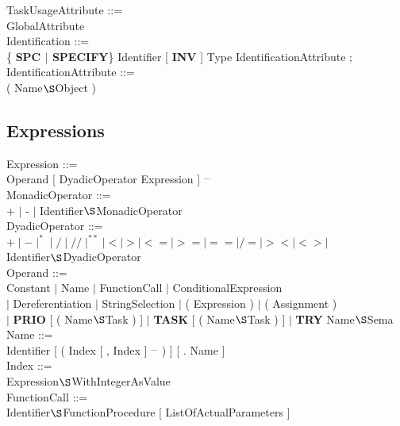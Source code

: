 TaskUsageAttribute ::=\\
 GlobalAttribute\\

Identification ::=\\
\x \{ {\bf SPC $\mid$ SPECIFY}\} Identifier [ {\bf INV} ] Type IdentificationAttribute ;\\

IdentificationAttribute ::= \\
 ( Name$\S $Object )\\

\subsection{Expressions}    %

Expression ::=\\
\x [ MonadicOperator ] Operand [ DyadicOperator   Expression ] $^{...}$\\

MonadicOperator ::=\\
\x + $\mid$ - $\mid$ Identifier$\S $MonadicOperator\\

DyadicOperator ::=\\
\x $ + \mid - \mid ^* \mid / \mid // \mid ^{**} \mid < \mid > \mid <= \mid >= \mid == \mid /= \mid >< \mid <> \mid$\\
\x Identifier$\S $DyadicOperator\\

Operand ::= \\
\x Constant $\mid$ Name $\mid$ FunctionCall $\mid$ ConditionalExpression\\
\x $\mid$ Dereferentiation $\mid$ StringSelection $\mid$ ( Expression ) $\mid$ ( Assignment ) \\
\x $\mid$ {\bf PRIO} [ ( Name$\S $Task ) ] $\mid$ {\bf TASK} [ ( Name$\S $Task ) ] $\mid$ {\bf TRY} Name$\S $Sema\\

Name ::=\\
\x Identifier [ ( Index [ , Index ] $^{...}$ ) ] [ . Name ]\\

Index ::=\\
\x Expression$\S $WithIntegerAsValue\\

FunctionCall ::=\\
\x Identifier$\S $FunctionProcedure [ ListOfActualParameters ]\\

